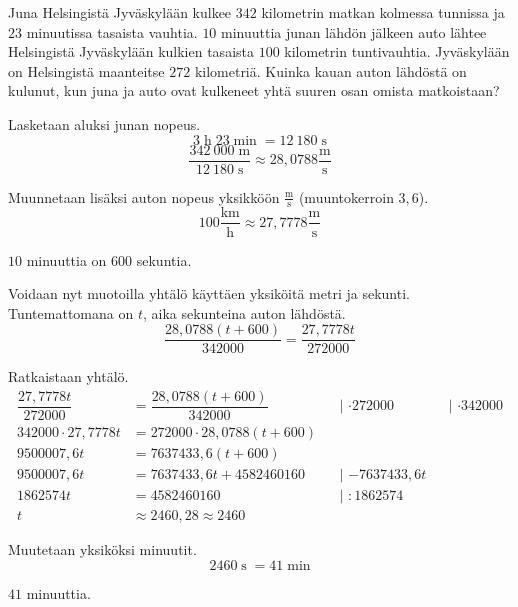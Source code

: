 \begin{esimerkki}
	Juna Helsingistä Jyväskylään kulkee $342$ kilometrin matkan kolmessa tunnissa ja $23$ minuutissa tasaista vauhtia.
	$10$ minuuttia junan lähdön jälkeen auto lähtee Helsingistä Jyväskylään kulkien tasaista $100$ kilometrin tuntivauhtia.
	Jyväskylään on Helsingistä maanteitse $272$ kilometriä.
	Kuinka kauan auton lähdöstä on kulunut, kun juna ja auto ovat kulkeneet yhtä suuren osan omista matkoistaan?
	\begin{esimratk}
		Lasketaan aluksi junan nopeus.
		\[ 3 \; \text{h} \; 23 \; \text{min} \; = 12~180 \; \text{s} \]
		\[ \dfrac{342~000 \; \text{m}}{12~180 \; \text{s}} \approx  28,0788 \frac{\text{m}}{\text{s}} \]
		
		Muunnetaan lisäksi auton nopeus yksikköön $\frac{\text{m}}{\text{s}}$ (muuntokerroin $3,6$).
		\[ 100 \frac{\text{km}}{\text{h}} \approx 27,7778 \frac{\text{m}}{\text{s}} \]
		
		$10$ minuuttia on $600$ sekuntia.
		
		Voidaan nyt muotoilla yhtälö käyttäen yksiköitä metri ja sekunti. Tuntemattomana on $t$, aika sekunteina auton lähdöstä.
		\[ \dfrac{28,0788(t+600)}{342000} = \dfrac{27,7778t}{272000} \]
		
		Ratkaistaan yhtälö.
		\begin{align*}
			\dfrac{27,7778t}{272000} &= \dfrac{28,0788(t+600)}{342000} &&\text{| $\cdot{272000}$} &&\text{| $\cdot{342000}$}  \\
			342000 \cdot 27,7778t &= 272000 \cdot 28,0788(t+600) \\
			9500007,6t &= 7637433,6(t+600) \\
			9500007,6t &= 7637433,6t + 4582460160 &&\text{| $-7637433,6t$} \\ 
			1862574t &= 4582460160 &&\text{| $:{1862574}$} \\
			t &\approx 2460,28 \approx 2460
		\end{align*}
		
		Muutetaan yksiköksi minuutit.
		\[ 2460 \; \text{s} \; = 41 \; \text{min} \]
	\end{esimratk}
	\begin{esimvast}
		$41$ minuuttia.
	\end{esimvast}
\end{esimerkki}




